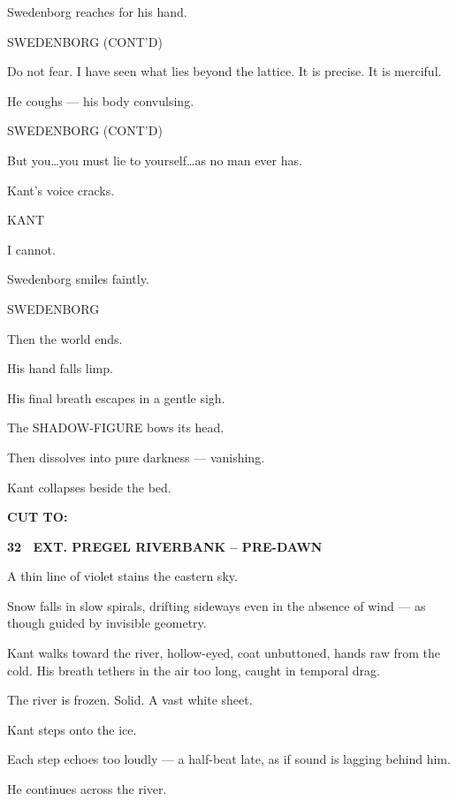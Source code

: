 \documentclass[12pt]{article}
\newcommand{\scene}[2]{%
  \vspace{1.8\baselineskip}%
  \noindent\textbf{#1 \ #2}\par\vspace{0.4\baselineskip}%
}
\newenvironment{dialogue}[1]{%
  \vspace{0.8\baselineskip}%
  \noindent\hspace*{2.3in}\textsc{#1}\par%
  \noindent\hspace*{1.5in}\begin{minipage}[t]{4.5in}%
}{%
  \end{minipage}\par%
}
\newcommand{\transition}[1]{%
  \vspace{0.6\baselineskip}%
  \begin{flushright}\textbf{#1}\end{flushright}%
}
\begin{document}
Swedenborg reaches for his hand.

\begin{dialogue}{SWEDENBORG (CONT'D)}
Do not fear. I have seen what lies beyond the lattice. It is precise.  
It is merciful.
\end{dialogue}

He coughs — his body convulsing.

\begin{dialogue}{SWEDENBORG (CONT'D)}
But you\ldots you must lie to yourself\ldots as no man ever has.
\end{dialogue}

Kant’s voice cracks.

\begin{dialogue}{KANT}
I cannot.
\end{dialogue}

Swedenborg smiles faintly.

\begin{dialogue}{SWEDENBORG}
Then the world ends.
\end{dialogue}

His hand falls limp.

His final breath escapes in a gentle sigh.

The SHADOW-FIGURE bows its head.

Then dissolves into pure darkness — vanishing.

Kant collapses beside the bed.

\transition{CUT TO:}


\scene{32}{EXT. PREGEL RIVERBANK -- PRE-DAWN}

A thin line of violet stains the eastern sky.

Snow falls in slow spirals, drifting sideways even in the absence of
wind — as though guided by invisible geometry.

Kant walks toward the river, hollow-eyed, coat unbuttoned, hands raw
from the cold. His breath tethers in the air too long, caught in
temporal drag.

The river is frozen. Solid. A vast white sheet.

Kant steps onto the ice.

Each step echoes too loudly — a half-beat late, as if sound is lagging
behind him.

He continues across the river.
\end{document}
